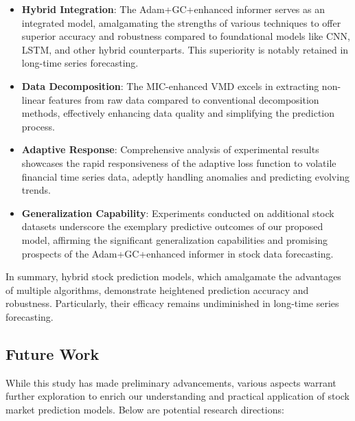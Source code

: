 \documentclass[sn-mathphys,Numbered]{sn-jnl}
\theoremstyle{thmstyleone}%
\theoremstyle{thmstyletwo}%
\theoremstyle{thmstylethree}%
\begin{document}
\begin{itemize}
    \item \textbf{Hybrid Integration}: The Adam+GC+enhanced informer serves as an integrated model, amalgamating the strengths of various techniques to offer superior accuracy and robustness compared to foundational models like CNN, LSTM, and other hybrid counterparts. This superiority is notably retained in long-time series forecasting.
    
    \item \textbf{Data Decomposition}: The MIC-enhanced VMD excels in extracting non-linear features from raw data compared to conventional decomposition methods, effectively enhancing data quality and simplifying the prediction process.
    
    \item \textbf{Adaptive Response}: Comprehensive analysis of experimental results showcases the rapid responsiveness of the adaptive loss function to volatile financial time series data, adeptly handling anomalies and predicting evolving trends.
    
    \item \textbf{Generalization Capability}: Experiments conducted on additional stock datasets underscore the exemplary predictive outcomes of our proposed model, affirming the significant generalization capabilities and promising prospects of the Adam+GC+enhanced informer in stock data forecasting.
\end{itemize}

In summary, hybrid stock prediction models, which amalgamate the advantages of multiple algorithms, demonstrate heightened prediction accuracy and robustness. Particularly, their efficacy remains undiminished in long-time series forecasting.


\subsection{Future Work}\label{sec5.2}

While this study has made preliminary advancements, various aspects warrant further exploration to enrich our understanding and practical application of stock market prediction models. Below are potential research directions:
\end{document}
